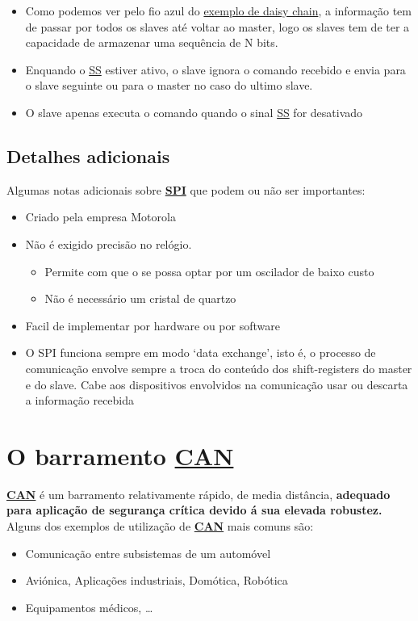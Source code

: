 \documentclass[a4paper, 12pt, onecolumn, oneside]{scrartcl}
\begin{document}
\begin{itemize}
    \item Como podemos ver pelo fio azul do \hyperref[fig3]{exemplo de daisy chain}, a informação tem de passar
    por todos os slaves até voltar ao master, logo os slaves tem de ter a capacidade de armazenar uma sequência de N bits.
    \item Enquando o \hyperref[ss]{SS} estiver ativo, o slave ignora o comando recebido e envia para o slave seguinte ou para o master no caso do ultimo slave.
    \item O slave apenas executa o comando quando o sinal \hyperref[ss]{SS} for desativado
\end{itemize}




\subsection{Detalhes adicionais}
Algumas notas adicionais sobre \hyperref[spi]{\textbf{SPI}} que podem ou não ser importantes:

\begin{itemize}
    \item Criado pela empresa Motorola
    \item Não é exigido precisão no relógio. 
    \begin{itemize}
        \item Permite com que o se possa optar por um oscilador de baixo custo 
        \item Não é necessário um cristal de quartzo
    \end{itemize}
    \item Facil de implementar por hardware ou por software
    \item O SPI funciona sempre em modo `data exchange', isto é, o processo de comunicação 
    envolve sempre a troca do conteúdo dos shift-registers do master e do slave. 
    Cabe aos dispositivos envolvidos na comunicação usar ou descarta a informação recebida
\end{itemize}

\section{O barramento \hyperref[can]{\textbf{CAN}}}
\hyperref[can]{\textbf{CAN}} é um barramento relativamente rápido, de media distância, \textbf{adequado
para aplicação de segurança crítica devido á sua elevada robustez.} 
Alguns dos exemplos de utilização de \hyperref[can]{\textbf{CAN}} mais comuns são:
\begin{itemize}
    \item Comunicação entre subsistemas de um automóvel
    \item Aviónica, Aplicações industriais, Domótica, Robótica
    \item Equipamentos médicos, \dots
\end{itemize}
\end{document}

